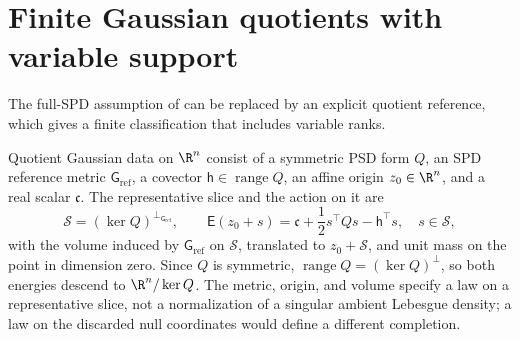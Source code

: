 \section{Finite Gaussian quotients with variable support}
\label{sec:cg-variable-support-quotients}

The full-SPD assumption of  can
be replaced by an explicit quotient reference, which gives a finite
classification that includes variable ranks.

Quotient Gaussian data on \(\R^n\) consist of a symmetric PSD form \(Q\), an SPD
reference metric \(\mathsf G_{\mathrm{ref}}\), a covector
\(\mathsf h\in\operatorname{range}Q\), an affine origin \(z_0\in\R^n\), and a
real scalar \(\mathfrak c\). The representative slice and the action on it are
\begin{equation}
\mathcal S=(\ker Q)^{\perp_{\mathsf G_{\mathrm{ref}}}},\qquad
\mathsf E(z_0+s)=\mathfrak c+\frac12s^\top Qs-\mathsf h^\top s,\quad s\in\mathcal S,
\label{eq:cg-quotient-reference-action}
\end{equation}
with the volume induced by \(\mathsf G_{\mathrm{ref}}\) on \(\mathcal S\),
translated to \(z_0+\mathcal S\), and unit mass on the point in dimension zero.
Since \(Q\) is symmetric, \(\operatorname{range}Q=(\ker Q)^\perp\), so both
energies descend to \(\R^n/\ker Q\). The metric, origin, and volume specify a
law on a representative slice, not a normalization of a singular ambient
Lebesgue density; a law on the discarded null coordinates would define a
different completion.

